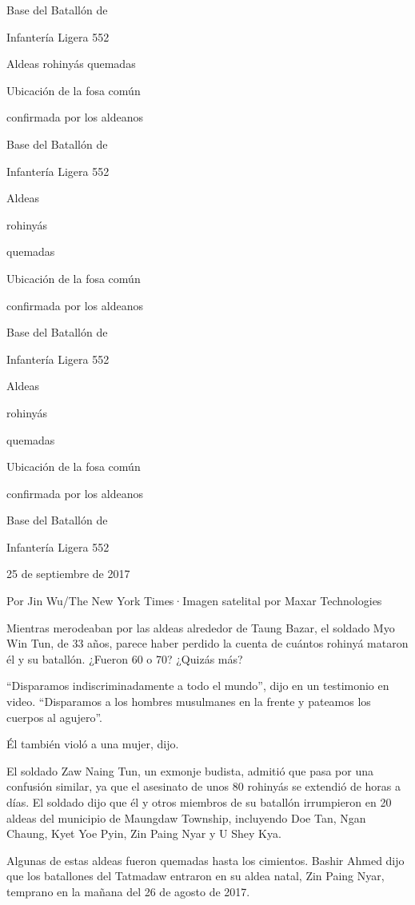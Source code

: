 Base del Batallón de

Infantería Ligera 552

Aldeas rohinyás quemadas

Ubicación de la fosa común

confirmada por los aldeanos

Base del Batallón de

Infantería Ligera 552

Aldeas

rohinyás

quemadas

Ubicación de la fosa común

confirmada por los aldeanos

Base del Batallón de

Infantería Ligera 552

Aldeas

rohinyás

quemadas

Ubicación de la fosa común

confirmada por los aldeanos

Base del Batallón de

Infantería Ligera 552

25 de septiembre de 2017

Por Jin Wu/The New York Times·Imagen satelital por Maxar Technologies

Mientras merodeaban por las aldeas alrededor de Taung Bazar, el soldado
Myo Win Tun, de 33 años, parece haber perdido la cuenta de cuántos
rohinyá mataron él y su batallón. ¿Fueron 60 o 70? ¿Quizás más?

``Disparamos indiscriminadamente a todo el mundo'', dijo en un
testimonio en video. ``Disparamos a los hombres musulmanes en la frente
y pateamos los cuerpos al agujero''.

Él también violó a una mujer, dijo.

El soldado Zaw Naing Tun, un exmonje budista, admitió que pasa por una
confusión similar, ya que el asesinato de unos 80 rohinyás se extendió
de horas a días. El soldado dijo que él y otros miembros de su batallón
irrumpieron en 20 aldeas del municipio de Maungdaw Township, incluyendo
Doe Tan, Ngan Chaung, Kyet Yoe Pyin, Zin Paing Nyar y U Shey Kya.

Algunas de estas aldeas fueron quemadas hasta los cimientos. Bashir
Ahmed dijo que los batallones del Tatmadaw entraron en su aldea natal,
Zin Paing Nyar, temprano en la mañana del 26 de agosto de 2017.

